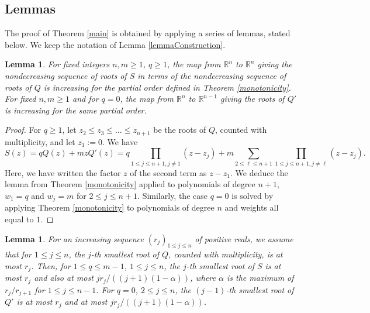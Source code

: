 \documentclass[11pt]{amsart}
\newtheorem{lemma}[theorem]{Lemma}
\begin{document}
\subsection{Lemmas}
The proof of Theorem \ref{main} is obtained by applying a series of lemmas, stated below. We keep the notation of Lemma
\ref{lemmaConstruction}. 
\begin{lemma} \label{monotonicitym}
For fixed integers $n, m \geq 1$, $q \geq 1$, the 
map from $\mathbb{R}^n$ to 
$\mathbb{R}^n$ giving the nondecreasing sequence of roots of $S$ in terms of the nondecreasing sequence of roots of $Q$ is increasing for the partial order 
defined in Theorem \ref{monotonicity}. 
For fixed $n, m \geq 1$ and for $q =0$, the map 
from $\mathbb{R}^n$ to 
$\mathbb{R}^{n-1}$ giving the roots of $Q'$ is increasing for the same partial order. 
\end{lemma}
\begin{proof}
For $q \geq 1$, let $z_2 \leq z_3\leq \dots \leq z_{n+1}$
be the roots of $Q$, counted with multiplicity, 
and let $z_{1} := 0$.
We have 
$$S(z) = q Q(z) + m z Q'(z)
= q \prod_{1 \leq j \leq n+1, j \neq 1} 
(z - z_j) 
+ m \sum_{2 \leq \ell \leq n+1} 
\prod_{1 \leq j \leq n+1, j \neq \ell} 
(z - z_j).
$$
Here, we have written the factor $z$ of the second term as $z - z_1$. 
We deduce the lemma from Theorem \ref{monotonicity}
applied to polynomials of degree $n+1$, 
$w_1 = q$ and $w_j = m$ for $2 \leq j \leq n+1$. 
Similarly, the case $q = 0$ is solved by applying 
Theorem \ref{monotonicity}
to polynomials of degree $n$ and weights all equal to $1$. 
\end{proof}


\begin{lemma} \label{upperbound}
For an increasing sequence $(r_j)_{1 \leq j \leq n}$ of positive reals, we assume that for $1 \leq j \leq n$, 
the $j$-th smallest root of $Q$, counted with multiplicity, is at most $r_j$. 
Then, for $1 \leq q \leq m-1$, $1 \leq j \leq n$, 
the $j$-th smallest root of $S$ is 
at most $r_j$ and also at most $ j r_j/((j+1)(1 - \alpha))$, 
where $\alpha$ is the maximum of $r_j/r_{j+1}$
for $1 \leq j \leq n-1$. For $q = 0$, 
$2 \leq j \leq n$, 
the $(j-1)$-th smallest root of $Q'$ is 
at most $r_j$ and at most $ j r_{j}/((j+1)(1 - \alpha))$.
\end{lemma}
\end{document}
